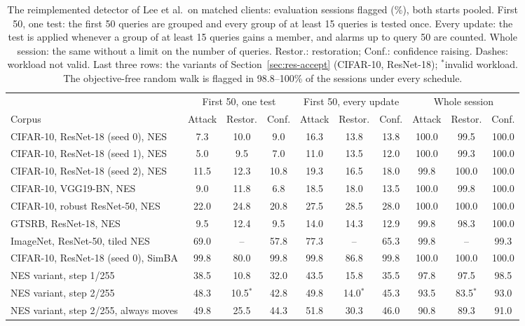 \begin{table}[!tbp]
\centering\footnotesize\setlength{\tabcolsep}{3pt}
\caption{The reimplemented detector of Lee et al.\ on matched clients: evaluation sessions flagged (\%), both starts pooled. First 50, one test: the first 50 queries are grouped and every group of at least 15 queries is tested once. Every update: the test is applied whenever a group of at least 15 queries gains a member, and alarms up to query 50 are counted. Whole session: the same without a limit on the number of queries. Restor.: restoration; Conf.: confidence raising. Dashes: workload not valid. Last three rows: the variants of Section~\ref{sec:res-accept} (CIFAR-10, ResNet-18); $^{\ast}$invalid workload. The objective-free random walk is flagged in 98.8--100\% of the sessions under every schedule.}
\label{tab:lfc}
\vspace{3pt}
\begin{adjustbox}{max width=\textwidth}
\begin{tabular}{lccccccccc}
\toprule
& \multicolumn{3}{c}{First 50, one test} & \multicolumn{3}{c}{First 50, every update} & \multicolumn{3}{c}{Whole session} \\
\cmidrule(lr){2-4}\cmidrule(lr){5-7}\cmidrule(lr){8-10}
Corpus & Attack & Restor. & Conf. & Attack & Restor. & Conf. & Attack & Restor. & Conf. \\
\midrule
CIFAR-10, ResNet-18 (seed 0), NES & 7.3 & 10.0 & 9.0 & 16.3 & 13.8 & 13.8 & 100.0 & 99.5 & 100.0 \\
CIFAR-10, ResNet-18 (seed 1), NES & 5.0 & 9.5 & 7.0 & 11.0 & 13.5 & 12.0 & 100.0 & 99.3 & 100.0 \\
CIFAR-10, ResNet-18 (seed 2), NES & 11.5 & 12.3 & 10.8 & 19.3 & 16.5 & 18.0 & 99.8 & 100.0 & 100.0 \\
CIFAR-10, VGG19-BN, NES & 9.0 & 11.8 & 6.8 & 18.5 & 18.0 & 13.5 & 100.0 & 99.8 & 100.0 \\
CIFAR-10, robust ResNet-50, NES & 22.0 & 24.8 & 20.8 & 27.5 & 28.5 & 28.0 & 100.0 & 100.0 & 100.0 \\
GTSRB, ResNet-18, NES & 9.5 & 12.4 & 9.5 & 14.0 & 14.3 & 12.9 & 99.8 & 98.3 & 100.0 \\
ImageNet, ResNet-50, tiled NES & 69.0 & -- & 57.8 & 77.3 & -- & 65.3 & 99.8 & -- & 99.3 \\
CIFAR-10, ResNet-18 (seed 0), SimBA & 99.8 & 80.0 & 99.8 & 99.8 & 86.8 & 99.8 & 100.0 & 100.0 & 100.0 \\[2pt]
NES variant, step 1/255 & 38.5 & 10.8 & 32.0 & 43.5 & 15.8 & 35.5 & 97.8 & 97.5 & 98.5 \\
NES variant, step 2/255 & 48.3 & 10.5$^{\ast}$ & 42.8 & 49.8 & 14.0$^{\ast}$ & 45.3 & 93.5 & 83.5$^{\ast}$ & 93.0 \\
NES variant, step 2/255, always moves & 49.8 & 25.5 & 44.3 & 51.8 & 30.3 & 46.0 & 90.8 & 89.3 & 91.0 \\
\bottomrule
\end{tabular}
\end{adjustbox}
\end{table}
